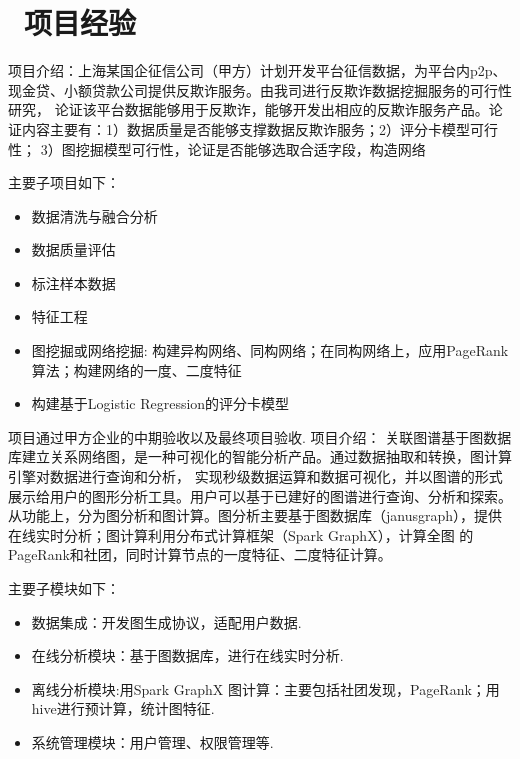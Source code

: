 \documentclass{resume}
\begin{document}
\section{\faUsers\ 项目经验}
项目介绍：上海某国企征信公司（甲方）计划开发平台征信数据，为平台内p2p、现金贷、小额贷款公司提供反欺诈服务。由我司进行反欺诈数据挖掘服务的可行性研究，
论证该平台数据能够用于反欺诈，能够开发出相应的反欺诈服务产品。论证内容主要有：1）数据质量是否能够支撑数据反欺诈服务；2）评分卡模型可行性；
3）图挖掘模型可行性，论证是否能够选取合适字段，构造网络
\\[2pt]
\begin{onehalfspacing}
主要子项目如下：
  \begin{itemize}
     \item 数据清洗与融合分析
     \item 数据质量评估	     
     \item 标注样本数据
     \item 特征工程
     \item 图挖掘或网络挖掘: 构建异构网络、同构网络；在同构网络上，应用PageRank算法；构建网络的一度、二度特征
     \item 构建基于Logistic Regression的评分卡模型
  \end{itemize}
\end{onehalfspacing}

项目通过甲方企业的中期验收以及最终项目验收.
项目介绍：
关联图谱基于图数据库建立关系网络图，是一种可视化的智能分析产品。通过数据抽取和转换，图计算引擎对数据进行查询和分析，
实现秒级数据运算和数据可视化，并以图谱的形式展示给用户的图形分析工具。用户可以基于已建好的图谱进行查询、分析和探索。
从功能上，分为图分析和图计算。图分析主要基于图数据库（janusgraph），提供在线实时分析；图计算利用分布式计算框架（Spark GraphX），计算全图
的PageRank和社团，同时计算节点的一度特征、二度特征计算。
\\[2pt]
\begin{onehalfspacing}
主要子模块如下：
\begin{itemize}
  \item 数据集成：开发图生成协议，适配用户数据.
  \item 在线分析模块：基于图数据库，进行在线实时分析.
  \item 离线分析模块:用Spark GraphX 图计算：主要包括社团发现，PageRank；用hive进行预计算，统计图特征.    
  \item 系统管理模块：用户管理、权限管理等.
\end{itemize}
\end{onehalfspacing}
\end{document}
